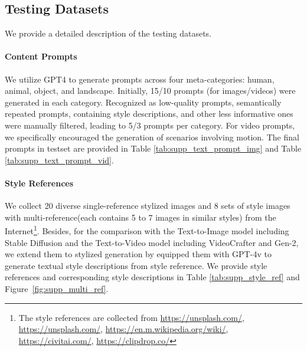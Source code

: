 \subsection{Testing Datasets}

We provide a detailed description of the testing datasets. 

\paragraph{Content Prompts} 
We utilize GPT4 to generate prompts across four meta-categories: human, animal, object, and landscape. Initially, 15/10 prompts (for images/videos) were generated in each category. Recognized as low-quality prompts, semantically repeated prompts, containing style descriptions, and other less informative ones were manually filtered, leading to 5/3 prompts per category. For video prompts, we specifically encouraged the generation of scenarios involving motion. The final prompts in testset are provided in Table \ref{tab:supp_text_prompt_img} and Table \ref{tab:supp_text_prompt_vid}. 

\paragraph{Style References} 
We collect 20 diverse single-reference stylized images and 8 sets of style images with multi-reference(each contains 5 to 7 images in similar styles) from the Internet\footnote{The style references are collected from \url{https://unsplash.com/}, \url{https://unsplash.com/}, \url{https://en.m.wikipedia.org/wiki/}, \url{https://civitai.com/}, \url{https://clipdrop.co/}}. Besides, for the comparison with the Text-to-Image model including Stable Diffusion and the Text-to-Video model including VideoCrafter and Gen-2, we extend them to stylized generation by equipped them with GPT-4v to generate textual style descriptions from style reference. We provide style references and corresponding style descriptions in Table \ref{tab:supp_style_ref} and Figure~\ref{fig:supp_multi_ref}.


